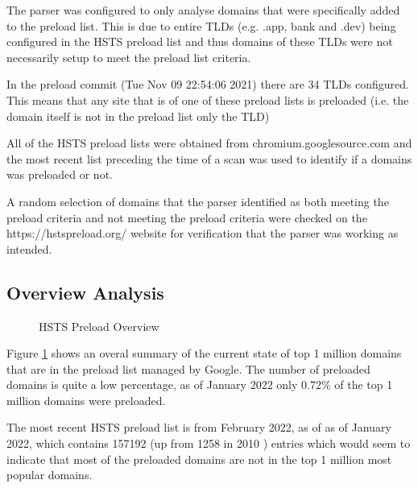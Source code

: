 \documentclass{mscreport}
\begin{document}
\vspace{0.3cm} \noindent
The parser was configured to only analyse domains that were specifically added to the preload list. This is due to entire TLDs (e.g. .app, bank and .dev) being configured in the HSTS preload list and thus domains of these TLDs were not necessarily setup to meet the preload list criteria.

\vspace{0.3cm} \noindent
In the preload commit (Tue Nov 09 22:54:06 2021) there are 34 TLDs configured. This means that any site that is of one of these preload lists is preloaded (i.e. the domain itself is not in the preload list only the TLD)

\vspace{0.3cm} \noindent
All of the HSTS preload lists were obtained from chromium.googlesource.com and the most recent list preceding the time of a scan was used to identify if a domains was preloaded or not.

\vspace{0.3cm} \noindent
A random selection of domains that the parser identified as both meeting the preload criteria and not meeting the preload criteria were checked on the https://hstspreload.org/ website for verification that the parser was working as intended.


\clearpage
\newpage


\subsection{Overview Analysis}

\begin{figure}[t]
	\begin{center}
		\caption{HSTS Preload Overview}
		\label{fig:hsts_preloaded_overview}
	\end{center}
\end{figure}

\noindent
Figure \ref{fig:hsts_preloaded_overview} shows an overal summary of the current state of top 1 million domains that are in the preload list managed by Google. The number of preloaded domains is quite a low percentage, as of January 2022 only 0.72\% of the top 1 million domains were preloaded.

\vspace{0.3cm} \noindent
The most recent HSTS preload list is from February 2022, as of as of January 2022, which contains 157192 (up from 1258 in 2010 \cite{Michael2015-hn}) entries which would seem to indicate that most of the preloaded domains are not in the top 1 million most popular domains.
\end{document}
